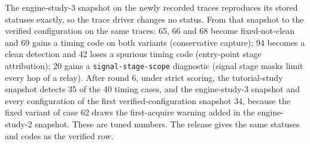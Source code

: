 \documentclass[acmtog,anonymous,review]{acmart}
\newcommand{\bench}{GPUBugBench\xspace}
\newcommand{\code}[1]{\texttt{#1}}
\begin{document}
\begin{table}[htbp]
\caption{Strict status of all 114 \bench reproductions per snapshot and configuration: detected / detected with unclean fixed variant /
expected miss / missed. All are development data for cases 1--16 and re-runs (not the blind per-round result) for
17--114.}
\label{tab:s-benchver}
\scriptsize
{}
\end{table}

The engine-study-3 snapshot on the newly recorded traces reproduces its stored statuses exactly, so the trace driver
changes no status. From that snapshot to the verified configuration on the same traces: 65, 66 and 68 become
fixed-not-clean and 69 gains a timing code on both variants (conservative capture); 94 becomes a clean detection and 42
loses a spurious timing code (entry-point stage attribution); 20 gains a \code{signal-stage-scope} diagnostic (signal
stage masks limit every hop of a relay). After round 6, under strict scoring, the tutorial-study snapshot detects 35 of
the 40 timing cases, and the engine-study-3 snapshot and every configuration of the first verified-configuration
snapshot 34, because the fixed variant of case 62 draws the first-acquire warning added in the engine-study-2 snapshot.
These are tuned numbers. The release gives the same statuses and codes as the verified
row.
\end{document}
